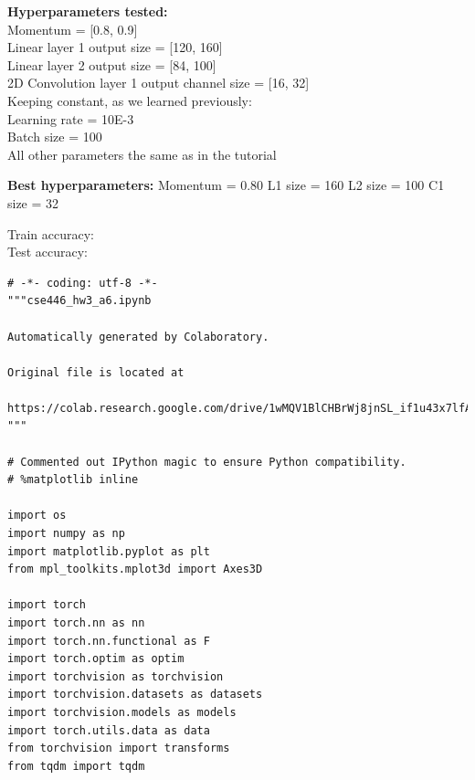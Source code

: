 \documentclass{article}
\newcommand{\1}{\mathbf{1}}
\begin{document}
{\textbf{Hyperparameters tested:} \\
Momentum = [0.8, 0.9] \\
Linear layer 1 output size = [120, 160] \\ 
Linear layer 2 output size = [84, 100] \\
2D Convolution layer 1 output channel size = [16, 32] \\
Keeping constant, as we learned previously: \\
Learning rate = 10E-3 \\
Batch size = 100 \\
All other parameters the same as in the tutorial 




\textbf{Best hyperparameters:}
Momentum = 0.80
L1 size = 160
L2 size = 100
C1 size = 32


Train accuracy: \\
Test accuracy: 

\newpage

\begin{verbatim}
# -*- coding: utf-8 -*-
"""cse446_hw3_a6.ipynb

Automatically generated by Colaboratory.

Original file is located at
    https://colab.research.google.com/drive/1wMQV1BlCHBrWj8jnSL_if1u43x7lfAIO
"""

# Commented out IPython magic to ensure Python compatibility.
# %matplotlib inline

import os
import numpy as np
import matplotlib.pyplot as plt
from mpl_toolkits.mplot3d import Axes3D

import torch
import torch.nn as nn
import torch.nn.functional as F
import torch.optim as optim
import torchvision as torchvision
import torchvision.datasets as datasets
import torchvision.models as models
import torch.utils.data as data
from torchvision import transforms
from tqdm import tqdm


\end{verbatim}}
\end{document}
